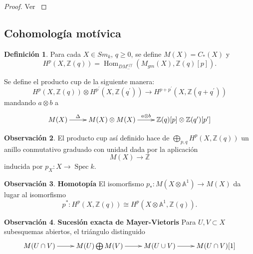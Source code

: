 \documentclass[10pt]{amsart}
\theoremstyle{definition}
\newtheorem{definition}{Definici\'on}[section]
\newtheorem{obs}[definition]{Observaci\'on}
\theoremstyle{remark}
\theoremstyle{definition}
\newcommand{\spec}{\operatorname{Spec}}
\begin{document}
\begin{proof}
Ver \cite[Thm. 3.2.6]{MVW06}
\end{proof}

\subsection{Cohomología motívica}
\begin{definition}
Para cada $X \in Sm_{\mathit{k}}$, $q \geq 0$, se define $M(X)=C_{*}(X)$ y
\begin{equation*}
H^{p}(X,\mathbb{Z}(q))=\operatorname{Hom}_{DM^{eff}_{-}}(M_{gm}(X),\mathbb{Z}(q)[p]).
\end{equation*}
\end{definition}

Se define el producto cup de la siguiente manera:
\begin{equation*}
H^{p}(X,\mathbb{Z}(q)) \otimes H^{p^{\prime}}(X,\mathbb{Z}(q^{\prime})) \rightarrow H^{p+p^{\prime}}(X,\mathbb{Z}(q+q^{\prime}))
\end{equation*}
mandando $a \otimes b$ a
\begin{equation*}
 \xymatrix{ M(X) \ar[r]^-{\Delta} & M(X)\otimes M(X) \ar[r]^-{a \otimes b} & \mathbb{Z}(q)[p] \otimes \mathbb{Z}(q^{\prime})[p^{\prime}]}
\end{equation*}

\begin{obs} El producto cup así definido hace de $\bigoplus_{p,q}H^{p}(X,\mathbb{Z}(q))$ un anillo conmutativo graduado con unidad dada por la aplicación
\begin{equation*} 
M(X) \rightarrow \mathbb{Z}
\end{equation*}
inducida por $p_{X}:X \rightarrow \spec \mathit{k}$.
\end{obs}

\begin{obs} \textbf{Homotopía} El isomorfismo $p_{*}:M(X \otimes \mathbb{A}^1) \rightarrow M(X)$ da lugar al isomorfismo
\begin{equation*}
p^{*}:H^{p}(X,\mathbb{Z}(q)) \cong H^{p}(X \otimes \mathbb{A}^1,\mathbb{Z}(q)).
\end{equation*}
\end{obs}

\begin{obs} \textbf{Sucesión exacta de Mayer-Vietoris} Para $U,V \subset X$ subesquemas abiertos, el triángulo distinguido
\begin{equation*}
 \xymatrix{ M(U \cap V) \ar[r] & M(U)\bigoplus M(V) \ar[r] & M(U \cup V) \ar[r] & M(U \cap V)[1]}
\end{equation*}
\end{obs}
\end{document}
